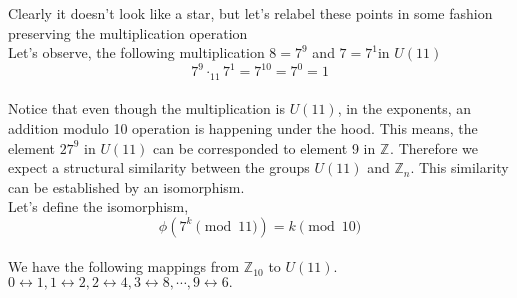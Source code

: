 \documentclass{article}
\begin{document}
\begin{center}
\end{center}
Clearly it doesn't look like a star, but let's relabel these points in some fashion preserving the multiplication operation\\[2mm]
Let's observe, the following multiplication $8 = 7^{9}$ and $7 = 7^1$in $U(11)$
$$7^{9} \cdot_{11} 7^ 1 = 7^{10} = 7^{0} = 1$$\\
Notice that even though the multiplication is $U(11)$, in the exponents, an addition modulo 10 operation is happening under the hood. This means, the element $27^9$ in $U(11)$ can be corresponded to element 9 in $\mathbb{Z}_{}$. Therefore we expect a structural similarity between the groups $U(11)$ and $\mathbb{Z}_n$. This similarity can be established by an isomorphism.\\[2mm]
Let's define the isomorphism,
$$\phi(7^k\pmod{11}) = k \pmod{10}$$\\
We have the following mappings from $\mathbb{Z}_{10}$ to $U(11)$. $0 \leftrightarrow 1, 1 \leftrightarrow 2, 2 \leftrightarrow 4, 3 \leftrightarrow 8, \cdots , 9 \leftrightarrow 6.$ 
 
\end{document}
